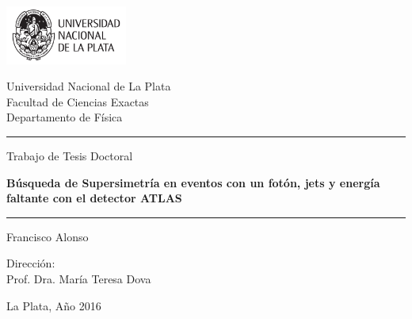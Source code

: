 \newcommand{\HRule}{\rule{\linewidth}{1pt}}

\begin{titlepage}

  \centering

  \includegraphics[width=0.30\textwidth]{figures/logo_unlp.pdf}


  \vspace{0.5cm}

  {
    \large \sc
    Universidad Nacional de La Plata \\[0.25cm]
    Facultad de Ciencias Exactas \\[0.25cm]
    Departamento de Física
  }

  \vspace{1.5cm}



  \HRule

  \vspace{0.2cm}

  {\large Trabajo de Tesis Doctoral}\\[0.5cm]

  \vspace{0.3cm}

  {
    \huge \bfseries Búsqueda de Supersimetría en eventos con un fotón,
    jets y energía faltante con el detector ATLAS\\[0.4cm]
  }

  \vspace{0.2cm}

  \HRule

  \vspace{1.5cm}

  \noindent
  {\large Francisco Alonso}

  \vspace{1cm}

  {\large Dirección: \\
  Prof. Dra. María Teresa Dova}

  \vfill

  {\large La Plata, Año 2016}

\end{titlepage}
